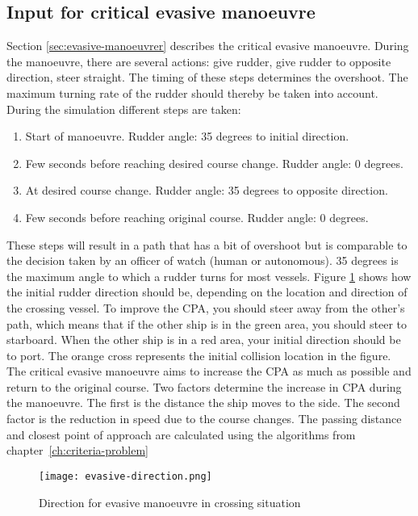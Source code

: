 \subsection{Input for critical evasive manoeuvre}
Section \ref{sec:evasive-manoeuvrer} describes the critical evasive manoeuvre. During the manoeuvre, there are several actions: give rudder, give rudder to opposite direction, steer straight. The timing of these steps determines the overshoot. The maximum turning rate of the rudder should thereby be taken into account.
During the simulation different steps are taken:
\begin{enumerate}
	\item Start of manoeuvre. Rudder angle: 35 degrees to initial direction.
	\item Few seconds before reaching desired course change. Rudder angle: 0 degrees.
	\item At desired course change. Rudder angle: 35 degrees to opposite direction.
	\item Few seconds before reaching original course. Rudder angle: 0 degrees.
\end{enumerate}
These steps will result in a path that has a bit of overshoot but is comparable to the decision taken by an officer of watch (human or autonomous). 35 degrees is the maximum angle to which a rudder turns for most vessels. Figure \ref{fig:evasive-direction} shows how the initial rudder direction should be, depending on the location and direction of the crossing vessel. To improve the CPA, you should steer away from the other's path, which means that if the other ship is in the green area, you should steer to starboard. When the other ship is in a red area, your initial direction should be to port. The orange cross represents the initial collision location in the figure.
The critical evasive manoeuvre aims to increase the \ac{CPA} as much as possible and return to the original course. Two factors determine the increase in \ac{CPA} during the manoeuvre. 
The first is the distance the ship moves to the side. The second factor is the reduction in speed due to the course changes. The passing distance and closest point of approach are calculated using the algorithms from chapter~\ref{ch:criteria-problem}

\begin{figure}[p]
	\centering
	\texttt{[image: evasive-direction.png]}
	\caption{Direction for evasive manoeuvre in crossing situation}
	\label{fig:evasive-direction} 
\end{figure}
